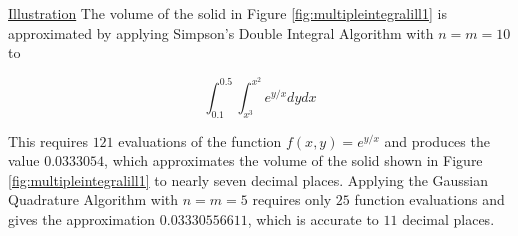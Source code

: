 %
%
%
%
%
%
%
%
%
%
%
\begin{boxB}
\underline{Illustration}
The volume of the solid in Figure \ref{fig:multipleintegralill1} is approximated by applying Simpson's Double Integral Algorithm with $n=m=10$ to

$$
\int_{0.1}^{0.5} \int_{x^{3}}^{x^{2}} e^{y / x} d y d x
$$

This requires $121$ evaluations of the function $f(x, y)=e^{y / x}$ and produces the value $0.0333054$, which approximates the volume of the solid shown in Figure \ref{fig:multipleintegralill1} to nearly seven decimal places. Applying the Gaussian Quadrature Algorithm with $n=m=5$ requires only $25$ function evaluations and gives the approximation $0.03330556611$, which is accurate to $11$ decimal places.
\end{boxB}
